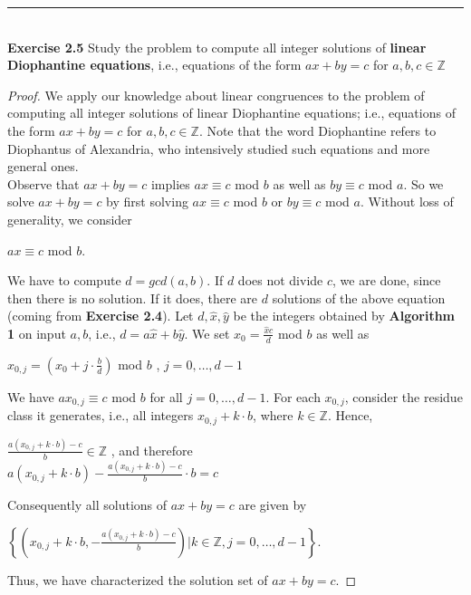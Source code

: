\documentclass[a4paper]{article}
\begin{document}
\noindent\rule{12cm}{0.4pt}\\
\noindent \textbf{Exercise 2.5} Study the problem to compute all integer solutions of \textbf{linear Diophantine equations}, i.e., equations of the form $ax + by = c$ for $a, b, c \in \mathbb{Z}$
\begin{proof}
We apply our knowledge about linear congruences to the problem of computing all integer solutions of linear Diophantine equations; i.e., equations of the form $ax + by = c$ for $a, b, c \in \mathbb{Z}$. Note that the word Diophantine refers to Diophantus of Alexandria, who intensively studied such equations and more general ones.\\
Observe that $ax + by = c$ implies $ax \equiv c$ mod $b$ as well as $by \equiv c$ mod $a$. So we solve $ax + by = c$ by first solving $ax \equiv c$ mod $b$ or $by \equiv c$ mod $a$. Without loss of generality, we consider\\
\begin{center}
$ax \equiv c$ mod $b$.
\end{center} 
We have to compute $d = gcd(a,b)$. If $d$ does not divide $c$, we are done, since then there is no solution. If it does, there are $d$ solutions of the above equation (coming from \textbf{Exercise 2.4}). Let $d, \hat{x}, \hat{y}$ be the integers obtained by \textbf{Algorithm 1} on input $a, b$, i.e., $d = a \hat{x} + b \hat{y}$. We set $x_{0} = \frac{\hat{x}c}{d}$ mod $b$ as well as
\begin{center}
$x_{0, j} = \left( x_{0} + j \cdot \frac{b}{d} \right)$ mod $b$ , $j = 0, \ldots, d - 1$
\end{center}
We have $ax_{0,j} \equiv c$ mod $b$ for all $j = 0, \ldots, d- 1$. For each $x_{0,j}$, consider the residue class it generates, i.e., all integers $x_{0,j} + k \cdot b$, where $k \in \mathbb{Z}$. Hence,
\begin{center}
$\frac{a(x_{0,j} + k \cdot b) - c}{b} \in \mathbb{Z}$ , and therefore \\
$a(x_{0, j} + k \cdot b) - \frac{a(x_{0, j} + k \cdot b) - c}{b} \cdot b = c$
\end{center}
Consequently all solutions of $ax + by = c$ are given by
\begin{center}
$\left\lbrace \left( x_{0, j} + k \cdot b, - \frac{a(x_{0,j} + k \cdot b) - c}{b} \right) | k \in \mathbb{Z}, j = 0, \ldots, d - 1 \right\rbrace$.
\end{center}
Thus, we have characterized the solution set of $ax + by = c$.
\end{proof}
\end{document}

